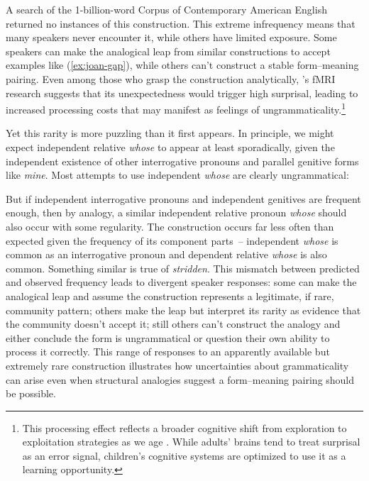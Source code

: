 \documentclass[12pt,letterpaper]{article}
\begin{document}
\z

A search of the 1-billion-word Corpus of Contemporary American English returned no instances of this construction. This extreme infrequency means that many speakers never encounter it, while others have limited exposure. Some speakers can make the analogical leap from similar constructions to accept examples like (\ref{ex:joan-gap}), while others can't construct a stable form--meaning pairing. Even among those who grasp the construction analytically, \textcite{shain2020fmri}'s fMRI research suggests that its unexpectedness would trigger high surprisal, leading to increased processing costs that may manifest as feelings of ungrammaticality.\footnote{This processing effect reflects a broader cognitive shift from exploration to exploitation strategies as we age \autocite{gopnik2017}. While adults' brains tend to treat surprisal as an error signal, children's cognitive systems are optimized to use it as a learning opportunity.}

Yet this rarity is more puzzling than it first appears. In principle, we might expect independent relative \textit{whose} to appear at least sporadically, given the independent existence of other interrogative pronouns and parallel genitive forms like \textit{mine}. Most attempts to use independent \textit{whose} are clearly ungrammatical:

\ea
   \z
\z

But if independent interrogative pronouns and independent genitives are frequent enough, then by analogy, a similar independent relative pronoun \textit{whose} should also occur with some regularity. The construction occurs far less often than expected given the frequency of its component parts~-- independent \textit{whose} is common as an interrogative pronoun and dependent relative \textit{whose} is also common. Something similar is true of \textit{stridden}. This mismatch between predicted and observed frequency leads to divergent speaker responses: some can make the analogical leap and assume the construction represents a legitimate, if rare, community pattern; others make the leap but interpret its rarity as evidence that the community doesn't accept it; still others can't construct the analogy and either conclude the form is ungrammatical or question their own ability to process it correctly. This range of responses to an apparently available but extremely rare construction illustrates how uncertainties about grammaticality can arise even when structural analogies suggest a form--meaning pairing should be possible.
\end{document}
